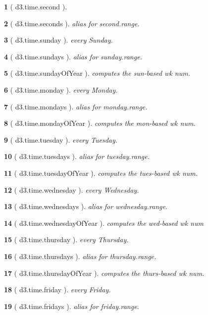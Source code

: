 \documentclass[10pt,landscape,letterpaper]{article}
\newcounter{thm}
\theoremstyle{mytheoremstyle}
\newtheorem*{thm}{}
\begin{document}
\begin{multicols}{3}
\begin{thm} [ d3.time.second ]
\end{thm}\begin{thm} [ d3.time.seconds ]  alias for second.range.
\end{thm}\begin{thm} [ d3.time.sunday ]  every Sunday.
\end{thm}\begin{thm} [ d3.time.sundays ]  alias for sunday.range.
\end{thm}\begin{thm} [ d3.time.sundayOfYear ]  computes the sun-based wk num.
\end{thm}\begin{thm} [ d3.time.monday ]  every Monday.
\end{thm}\begin{thm} [ d3.time.mondays ]  alias for monday.range.
\end{thm}\begin{thm} [ d3.time.mondayOfYear ]  computes the mon-based wk num.
\end{thm}\begin{thm} [ d3.time.tuesday ]  every Tuesday.
\end{thm}\begin{thm} [ d3.time.tuesdays ]  alias for tuesday.range.
\end{thm}\begin{thm} [ d3.time.tuesdayOfYear ]  computes the tues-based wk num.
\end{thm}\begin{thm} [ d3.time.wednesday ]  every Wednesday.
\end{thm}\begin{thm} [ d3.time.wednesdays ]  alias for wednesday.range.
\end{thm}\begin{thm} [ d3.time.wednesdayOfYear ] computes the wed-based wk num
\end{thm}\begin{thm} [ d3.time.thursday ]  every Thursday.
\end{thm}\begin{thm} [ d3.time.thursdays ]  alias for thursday.range.
\end{thm}\begin{thm} [ d3.time.thursdayOfYear ]  computes the thurs-based wk num.
\end{thm}\begin{thm} [ d3.time.friday ]  every Friday.
\end{thm}\begin{thm} [ d3.time.fridays ]  alias for friday.range.

\end{thm}
\end{multicols}
\end{document}
